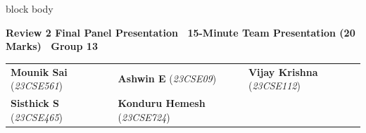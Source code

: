 \documentclass[aspectratio=169, 10pt]{beamer}
\newenvironment{card}[1][]{%
        \begin{beamercolorbox}[rounded=true,shadow=false,wd=\linewidth,sep=3.5pt,#1]{block body}%
        \fontsize{7.8pt}{9.8pt}\selectfont%
    }{%
        \end{beamercolorbox}%
    }
\begin{document}
\begin{frame}[plain]
\begin{center}
            \begin{card}                                                                                                                                                                               
                \centering                                                                                                                                                                             
                {\fontsize{8pt}{10pt}\selectfont \textbf{\color{NavyPrimary}Review 2 Final Panel Presentation \textbullet\ 15-Minute Team Presentation (20 Marks) \textbullet\ Group 13}}\\[0.12cm]    
                \footnotesize                                                                                                                                                                          
                \begin{tabular}{p{4.3cm}p{4.3cm}p{4.3cm}}                                                                                                                                              
                    \textbf{Mounik Sai} (\textit{23CSE561}) & \textbf{Ashwin E} (\textit{23CSE09}) & \textbf{Vijay Krishna} (\textit{23CSE112}) \\                                                       
                    \textbf{Sisthick S} (\textit{23CSE465}) & \textbf{Konduru Hemesh} (\textit{23CSE724})                                        
                \end{tabular}                                                                                                                                                                          
            \end{card}                                                                                                                                                                                 
        \end{center}                                                                                                                                                                                   
    \end{frame}                                                                                                                                                                                        
                                                                                                                                                                                                       
\end{document}
